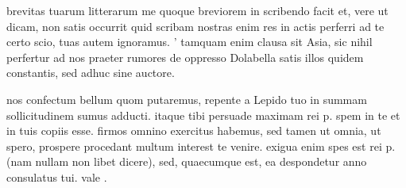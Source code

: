 


 brevitas tuarum litterarum me quoque breviorem in scribendo facit et, vere ut dicam, non satis occurrit quid scribam nostras enim res in actis perferri ad te certo scio, tuas autem ignoramus. ' tamquam enim clausa sit Asia, sic nihil perfertur ad nos praeter rumores de oppresso Dolabella satis illos quidem constantis, sed adhuc sine auctore.

 nos confectum bellum quom putaremus, repente a Lepido tuo in summam sollicitudinem sumus adducti. itaque tibi persuade maximam rei p. spem in te et in tuis copiis esse. firmos omnino exercitus habemus, sed tamen ut omnia, ut spero, prospere procedant multum interest te venire. exigua enim spes est rei p. (nam nullam non libet dicere), sed, quaecumque est, ea despondetur anno consulatus tui. vale .
